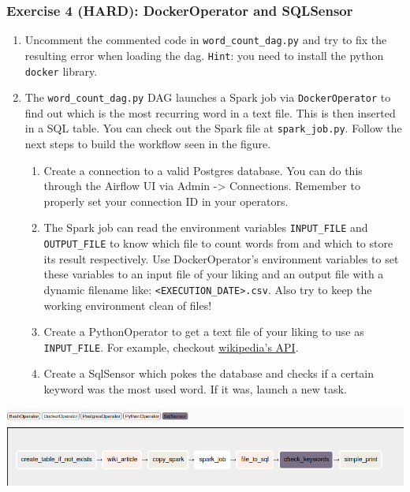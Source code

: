 \documentclass[leqno, 10pt, envcountsect]{beamer}
\numberwithin{equation}{section}
\theoremstyle{definition}
\theoremstyle{example}
\numberwithin{figure}{section}
\numberwithin{table}{section}
\let\olditem\item
\renewcommand{\item}{%
\olditem\vspace{1pt}}
\begin{document}
\begin{frame}[fragile=singleslide]
  \frametitle{Exercise 4 (HARD): DockerOperator and SQLSensor}
  \begin{enumerate}
    \item Uncomment the commented code in \texttt{word\_count_dag.py} and try to
      fix the resulting error when loading the dag. \texttt{Hint}: you need to
      install the python \texttt{docker} library.
    \item The \texttt{word\_count_dag.py} DAG launches a Spark job via
      \texttt{DockerOperator} to find out which is the most recurring word in a
      text file. This is then inserted in a SQL table. You can check out the
      Spark file at \texttt{spark_job.py}.  Follow the next steps to build the
      workflow seen in the figure.
    \begin{enumerate}
      \item Create a connection to a valid Postgres database. You can do this
        through the Airflow UI via Admin -> Connections. Remember to properly
        set your connection ID in your operators.
      \item The Spark job can read the environment variables
        \texttt{INPUT\_FILE} and \texttt{OUTPUT\_FILE} to know which file to
        count words from and which to store its result respectively. Use
        DockerOperator's environment variables to set these variables to an
        input file of your liking and an output file with a dynamic filename
        like: \texttt{<EXECUTION\_DATE>.csv}. Also try to keep the working
        environment clean of files!
      \item Create a PythonOperator to get a text file of your liking to use as
        \texttt{INPUT\_FILE}. For example, checkout
        \href{https://wikipedia.readthedocs.io/en/latest/code.html}{wikipedia's
        API}.
      \item Create a SqlSensor which pokes the database and checks if a certain
        keyword was the most used word. If it was, launch a new task.
    \end{enumerate}
  \end{enumerate}
  \begin{center}
    \includegraphics[scale=0.2]{exercise_4.png}
  \end{center}
\end{frame}
\end{document}

